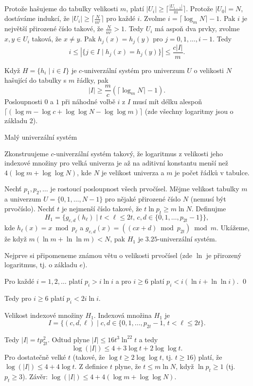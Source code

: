 \documentclass[a4paper,12pt]{article}
\begin{document}
Protože hašujeme do tabulky velikosti $m$, platí 
$|U_i|\ge\lceil\frac {|U_{i-1}|}m\rceil$. Protože $|U_0|=N$, dostáváme indukcí, že 
$|U_i|\ge\lceil\frac N{m^i}\rceil$ pro každé $i$. Zvolme $i=
\lceil\log_mN\rceil -1$. Pak $i$ je 
největší přirozené číslo takové, že $\frac 
N{m^i}>1$. Tedy $U_i$ má 
aspoň dva prvky, zvolme $x,y\in U_i$ taková, že $x\ne y$. Pak 
$h_j(x)=h_j(y)$ pro $j=0,1,\dots,i-1$. Tedy 
$$i\le |\{j\in I\mid h_j(x)=h_j(y)\}|\le\frac {c|I|}m.$$

Když $H=\{h_i\mid i\in I\}$ je $c$-univerzální systém pro 
univerzum $U$ o velikosti $N$ hašující do tabulky s $m$ řádky, pak 
$$|I|\ge\frac mc(\lceil\log_mN\rceil -1).$$
Posloupnosti $0$ a $1$ při náhodné volbě $i$ z $I$ musí mít 
délku alespoň $\lceil (\log m-\log c+\log\log N-\log\log m)\rceil$ (zde všechny logaritmy 
jsou o základu $2$).
\endproclaim

\subhead
Malý univerzální systém
\endsubhead

Zkonstruujeme $c$-univerzální systém takový, 
že logaritmus z velikosti jeho indexové množiny pro velká 
univerza je až na aditivní konstantu menší než 
$4(\log m+\log\log N)$, kde $N$ je velikost univerza a $m$ je počet 
řádků v tabulce.  

Nech\v t $p_1,p_2,\dots$ je rostoucí posloupnost všech 
prvočísel. Měj\-me velikost tabulky $m$ a univerzum $U=
\{0,1,\dots,N-1\}$ pro 
nějaké přirozené číslo $N$ (nemusí být prvočíslo). Nech\v t $
t$ je 
nejmenší číslo takové, že $t\ln p_t\ge m\ln N$. Definujme 
$$H_1=\{g_{c,d}(h_{\ell})\mid t<\ell\le 2t,\,c,d\in \{0,1,\dots,p_{
2t}-1\}\},$$
kde $h_{\ell}(x)=x\bmod p_{\ell}$ a 
$g_{c,d}(x)=((cx+d)\bmod p_{2t})\bmod m$.\newline 
Ukážeme, že když $m(\ln m+\ln\ln m)<N$, pak $H_1$ je $
3.25$-univerzální systém. 

Nejprve si připomeneme známou větu o velikosti prvočísel 
(zde $\ln$ je přirozený logaritmus, tj. o základu $e$).

Pro každé $i=1,2,\dots$ platí $p_i>i\ln 
i$ a pro $i\ge 6$ 
platí $p_i<i(\ln i+\ln\ln i)$. \qed
\endproclaim

Tedy pro $i\ge 6$ platí $p_i<2i\ln i$.

Velikost indexové množiny $H_1$.  Indexová množina $
H_1$ je 
$$I=\{(c,d,\ell )\mid c,d\in \{0,1,\dots,p_{2t}-1,\,t<\ell\le 2t\}
.$$
  
Tedy $|I|=tp_{2t}^2$.   
Odtud plyne $|I|\le 16t^3\ln^22t$ a tedy 
$$\log(|I|)\le 4+3\log t+2\log\log t.$$
Pro dostatečně velké $t$ (takové, že $\log t\ge 2\log\log 
t$, tj. $t\ge 16$) platí, 
že $\log(|I|)\le 4+4\log t$.  Z definice $t$ plyne, 
že $t\le m\ln N$, když $\ln p_t\ge 1$ (tj.  $p_t\ge 3$).\newline 
Závěr: $\log(|I|)\le 4+4(\log m+\log\log N)$. 
\end{document}
